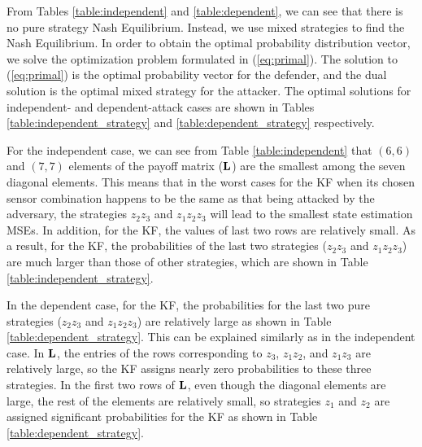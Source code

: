 \documentclass{article}
\begin{document}
From  Tables \ref{table:independent} and   \ref{table:dependent}, we can see that there is no pure strategy Nash Equilibrium. Instead, we  use mixed strategies to find the Nash Equilibrium. In order to obtain  the optimal probability distribution vector,  we solve the optimization problem formulated in (\ref{eq:primal}).
The  solution to (\ref{eq:primal}) is the optimal probability vector for the defender, and the   dual solution is the optimal mixed strategy for the attacker. The optimal  solutions for  independent- and dependent-attack cases are shown in Tables \ref{table:independent_strategy} and \ref{table:dependent_strategy} respectively.  

For the independent case, we can see from Table \ref{table:independent} that  $(6,6)$ and $(7,7)$ elements of the payoff matrix (${\bf L}$) are the smallest among the seven diagonal elements. This means that in the worst cases for the KF when its chosen sensor combination happens to be  the same as that being attacked by the adversary,  the strategies  $z_2z_3$  and $z_1z_2z_3$  will lead to the smallest state estimation MSEs.  In addition,  for the KF, the values of last two rows are relatively small. As a result, for the KF, the probabilities of  the last two strategies ($z_2z_3$ and $z_1z_2z_3$) are much larger  than those of other strategies, which are shown in Table \ref{table:independent_strategy}. 

In the dependent case, for the KF, the probabilities for the last two pure strategies ($z_2z_3$ and $z_1z_2z_3$) are relatively large as  shown in Table \ref{table:dependent_strategy}. This can be explained similarly as in the independent case.   In ${\bf L}$, the entries of the  rows corresponding to $z_3$, $z_1z_2$, and $z_1z_3$  are relatively large, so the KF assigns nearly zero probabilities to these three strategies. In  the first two rows of ${\bf L}$, even though the diagonal elements are large, the rest of the elements are relatively small, so strategies $z_1$ and $z_2$ are assigned significant probabilities for the KF as shown in Table \ref{table:dependent_strategy}.



 
\end{document}
